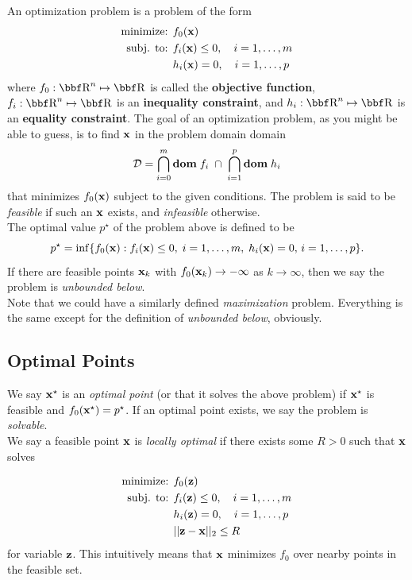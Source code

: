 \documentclass{article}
\begin{document}
An optimization problem is a problem of the form
\begin{align*}
    \text{minimize: } & f_0({\bf x})\\
    \text{subj. to: } & f_i({\bf x}) \leq 0, \quad i=1,\dots,m\\
                      & h_i({\bf x}) = 0, \quad i=1,\dots,p
\end{align*}
where $f_0 : \RR^n \mapsto \RR$ is called the \textbf{objective function},
$f_i : \RR^n \mapsto \RR$ is an \textbf{inequality constraint}, and
$h_i : \RR^n \mapsto \RR$ is an \textbf{equality constraint}. The goal of
an optimization problem, as you might be able to guess, is to find ${\bf x}$ in
the problem domain domain 
\[
    {\cal D} = \bigcap_{i=0}^m\mathbf{dom}\; f_i \;\cap\; \bigcap_{i=1}^p \mathbf{dom}\; h_i
\]
that minimizes $f_0({\bf x})$ subject to the given conditions. The problem is
said to be \textit{feasible} if such an ${\bf x}$ exists, and \textit{infeasible}
otherwise.\\

The optimal value $p^\star$ of the problem above is defined to be
\[
    p^\star = \inf\{f_0({\bf x}) : f_i({\bf x}) \leq 0,\; i=1,\dots,m,\; h_i({\bf x})=0,\, i=1,\dots,p\}.
\]
If there are feasible points ${\bf x}_k$ with $f_0({\bf x}_k)\to -\infty$ as
$k\to\infty$, then we say the problem is \textit{unbounded below}.\\

Note that we could have a similarly defined \textit{maximization} problem.
Everything is the same except for the definition of \textit{unbounded below},
obviously.

\subsection{Optimal Points}

We say ${\bf x}^\star$ is an \textit{optimal point} (or that it solves the
above problem) if ${\bf x}^\star$ is feasible and $f_0({\bf x}^\star)=p^\star$.
If an optimal point exists, we say the problem is \textit{solvable}.\\

We say a feasible point ${\bf x}$ is \textit{locally optimal} if there exists
some $R > 0$ such that ${\bf x}$ solves

\begin{align*}
    \text{minimize: } & f_0({\bf z})\\
    \text{subj. to: } & f_i({\bf z}) \leq 0, \quad i=1,\dots,m\\
                      & h_i({\bf z}) = 0, \quad i=1,\dots,p\\
                      & || {\bf z} - {\bf x} ||_2 \leq R
\end{align*}
for variable ${\bf z}$. This intuitively means that ${\bf x}$ minimizes
$f_0$ over nearby points in the feasible set.
\end{document}
